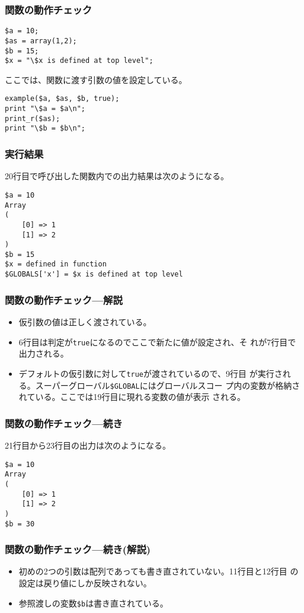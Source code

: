 \begin{frame}[containsverbatim]
\frametitle{関数の動作チェック}
\begin{Verbatim}
$a = 10;
$as = array(1,2);
$b = 15;
$x = "\$x is defined at top level";
\end{Verbatim}
ここでは、関数に渡す引数の値を設定している。
\begin{Verbatim}
example($a, $as, $b, true);
print "\$a = $a\n";
print_r($as);
print "\$b = $b\n";
\end{Verbatim}
\end{frame}
\begin{frame}[containsverbatim]
 \frametitle{実行結果}
 20行目で呼び出した関数内での出力結果は次のようになる。
\begin{Verbatim}
$a = 10
Array
(
    [0] => 1
    [1] => 2
)
$b = 15
$x = defined in function
$GLOBALS['x'] = $x is defined at top level
\end{Verbatim}
\end{frame}
\begin{frame}[containsverbatim]
\frametitle{関数の動作チェック---解説}
\begin{itemize}
 \item 仮引数の値は正しく渡されている。
 \item 6行目は判定が\texttt{true}になるのでここで新たに値が設定され、そ
       れが7行目で出力される。
 \item デフォルトの仮引数に対して\texttt{true}が渡されているので、9行目
       が実行される。スーパーグローバル\verb+$GLOBAL+にはグローバルスコー
       プ内の変数が格納されている。ここでは19行目に現れる変数の値が表示
       される。
\end{itemize}
\end{frame}
\begin{frame}[containsverbatim]
\frametitle{関数の動作チェック---続き}
21行目から23行目の出力は次のようになる。
\begin{Verbatim}
$a = 10
Array
(
    [0] => 1
    [1] => 2
)
$b = 30
\end{Verbatim}
\end{frame}
\begin{frame}[containsverbatim]
\frametitle{関数の動作チェック---続き(解説)}
\begin{itemize}
 \item 初めの2つの引数は配列であっても書き直されていない。11行目と12行目
       の設定は戻り値にしか反映されない。
 \item 参照渡しの変数\verb+$b+は書き直されている。
\end{itemize}
\end{frame}
